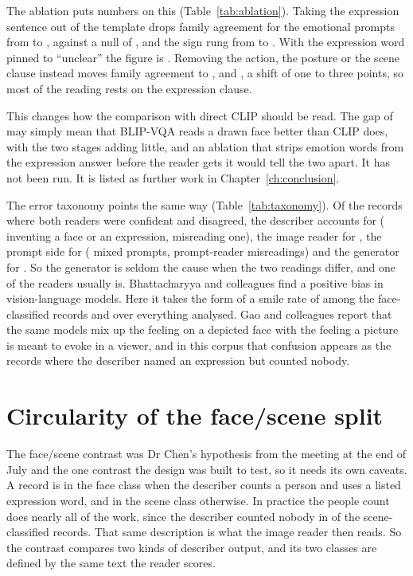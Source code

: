 The ablation puts numbers on this (Table~\ref{tab:ablation}). Taking the expression sentence out of the template drops family agreement for the emotional prompts from \FullEmoFamObs{} to \AblDropExpressionEmoFamObs{}, against a null of \AblDropExpressionEmoFamNull{}, and the sign rung from \FullEmoSignObs{} to \AblDropExpressionEmoSignObs{}. With the expression word pinned to ``unclear'' the figure is \AblFixedExpressionEmoFamObs{}. Removing the action, the posture or the scene clause instead moves family agreement to \AblDropActionEmoFamObs{}, \AblDropPostureEmoFamObs{} and \AblDropSceneEmoFamObs{}, a shift of one to three points, so most of the reading rests on the expression clause.

This changes how the comparison with direct CLIP should be read. The gap of \McDiffFamPp{} may simply mean that BLIP-VQA reads a drawn face better than CLIP does, with the two stages adding little, and an ablation that strips emotion words from the expression answer before the reader gets it would tell the two apart. It has not been run. It is listed as further work in Chapter~\ref{ch:conclusion}.

The error taxonomy points the same way (Table~\ref{tab:taxonomy}). Of the \TaxN{} records where both readers were confident and disagreed, the describer accounts for \TaxDescriber{} (\TaxA{} inventing a face or an expression, \TaxB{} misreading one), the image reader for \TaxReader{}, the prompt side for \TaxPrompt{} (\TaxD{} mixed prompts, \TaxF{} prompt-reader misreadings) and the generator for \TaxGenerator{}. So the generator is seldom the cause when the two readings differ, and one of the readers usually is. Bhattacharyya and colleagues \cite{bhattacharyya2025evaluating} find a positive bias in vision-language models. Here it takes the form of a smile rate of \DescSmileFace{} among the \nFaceAll{} face-classified records and \DescSmileAll{} over everything analysed. Gao and colleagues \cite{gao2025eemo} report that the same models mix up the feeling on a depicted face with the feeling a picture is meant to evoke in a viewer, and in this corpus that confusion appears as the \DescScenePeopleZeroExpr{} records where the describer named an expression but counted nobody.

\section{Circularity of the face/scene split}
\label{sec:disc-circularity}

The face/scene contrast was Dr Chen's hypothesis from the meeting at the end of July and the one contrast the design was built to test, so it needs its own caveats. A record is in the face class when the describer counts a person and uses a listed expression word, and in the scene class otherwise. In practice the people count does nearly all of the work, since the describer counted nobody in \DescScenePeopleZero{} of the \DescSceneN{} scene-classified records. That same description is what the image reader then reads. So the contrast compares two kinds of describer output, and its two classes are defined by the same text the reader scores.

